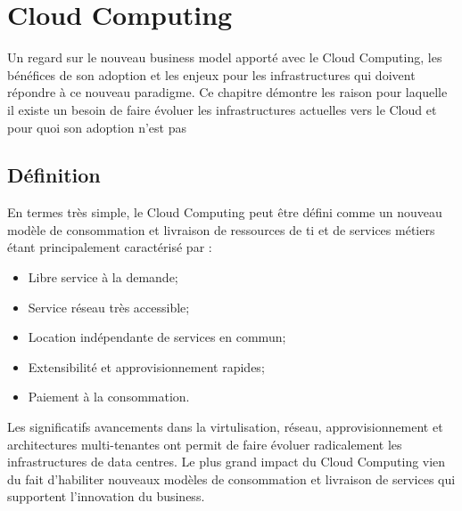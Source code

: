 
\chapter{Cloud Computing}

 Un regard sur le nouveau business model apporté avec le Cloud Computing, les bénéfices de son adoption et les enjeux pour les infrastructures qui doivent répondre à ce nouveau paradigme. Ce chapitre démontre les raison pour laquelle il existe un besoin de faire évoluer les infrastructures actuelles vers le Cloud et pour quoi son adoption n'est pas 

\section{Définition}
En termes très simple, le Cloud Computing peut être défini comme un nouveau modèle de consommation et livraison de ressources de \gls{ti} et de services métiers étant principalement caractérisé par :
\begin{itemize}
\item Libre service à la demande;
\item Service réseau très accessible;
\item Location indépendante de services en commun;
\item Extensibilité et approvisionnement rapides;
\item Paiement à la consommation.
\end{itemize}
Les significatifs avancements dans la virtulisation, réseau, approvisionnement et architectures multi-tenantes ont permit de faire évoluer radicalement les infrastructures de data centres. Le plus grand impact du Cloud Computing vien du fait d'habiliter nouveaux modèles de consommation et livraison de services qui supportent l'innovation du business.

